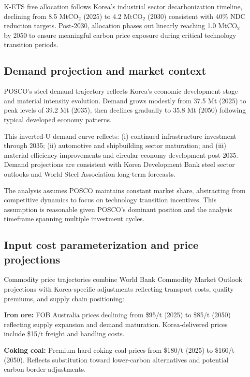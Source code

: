 \documentclass[preprint,5p,authoryear]{elsarticle}
\begin{document}
K-ETS free allocation follows Korea's industrial sector decarbonization timeline, declining from 8.5 MtCO$_2$ (2025) to 4.2 MtCO$_2$ (2030) consistent with 40\% NDC reduction targets. Post-2030, allocation phases out linearly reaching 1.0 MtCO$_2$ by 2050 to ensure meaningful carbon price exposure during critical technology transition periods.

\subsection{Demand projection and market context}

POSCO's steel demand trajectory reflects Korea's economic development stage and material intensity evolution. Demand grows modestly from 37.5 Mt (2025) to peak levels of 39.2 Mt (2035), then declines gradually to 35.8 Mt (2050) following typical developed economy patterns.

This inverted-U demand curve reflects: (i) continued infrastructure investment through 2035; (ii) automotive and shipbuilding sector maturation; and (iii) material efficiency improvements and circular economy development post-2035. Demand projections are consistent with Korea Development Bank steel sector outlooks and World Steel Association long-term forecasts.

The analysis assumes POSCO maintains constant market share, abstracting from competitive dynamics to focus on technology transition incentives. This assumption is reasonable given POSCO's dominant position and the analysis timeframe spanning multiple investment cycles.

\subsection{Input cost parameterization and price projections}

Commodity price trajectories combine World Bank Commodity Market Outlook projections with Korea-specific adjustments reflecting transport costs, quality premiums, and supply chain positioning:

\textbf{Iron ore:} FOB Australia prices declining from \$95/t (2025) to \$85/t (2050) reflecting supply expansion and demand maturation. Korea-delivered prices include \$15/t freight and handling costs.

\textbf{Coking coal:} Premium hard coking coal prices from \$180/t (2025) to \$160/t (2050). Reflects substitution toward lower-carbon alternatives and potential carbon border adjustments.
\end{document}
